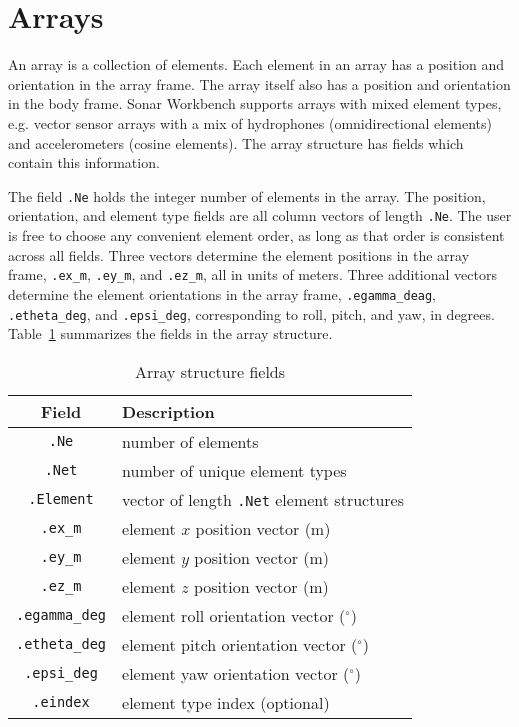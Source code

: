 \section{Arrays}\label{sec:array}

An array is a collection of elements. Each element in an array has a position and orientation in the array frame. The array itself also has a position and orientation in the body frame. Sonar Workbench supports arrays with mixed element types, e.g. vector sensor arrays with a mix of hydrophones (omnidirectional elements) and accelerometers (cosine elements). The array structure has fields which contain this information.

The field \texttt{.Ne} holds the integer number of elements in the array. The position, orientation, and element type fields are all column vectors of length \texttt{.Ne}. The user is free to choose any convenient element order, as long as that order is consistent across all fields. Three vectors determine the element positions in the array frame, \texttt{.ex\_m}, \texttt{.ey\_m}, and \texttt{.ez\_m}, all in units of meters. Three additional vectors determine the element orientations in the array frame, \texttt{.egamma\_deag}, \texttt{.etheta\_deg}, and \texttt{.epsi\_deg}, corresponding to roll, pitch, and yaw, in degrees. Table~\ref{tab:ArrayFields} summarizes the fields in the array structure. 

\begin{table}[!ht]
	\begin{center}
		\caption{Array structure fields}
		\label{tab:ArrayFields}
		\begin{tabular}{c|l} 
			\textbf{Field} & \textbf{Description} \\
			\hline
			\texttt{.Ne} & number of elements \\
			\texttt{.Net} & number of unique element types \\
			\texttt{.Element} & vector of length \texttt{.Net} element structures \\
			\texttt{.ex\_m} & element $x$ position vector (m) \\
			\texttt{.ey\_m} & element $y$ position vector (m) \\
			\texttt{.ez\_m} & element $z$ position vector (m) \\
			\texttt{.egamma\_deg} & element roll orientation vector ($^\circ$) \\
			\texttt{.etheta\_deg} & element pitch orientation vector ($^\circ$) \\
			\texttt{.epsi\_deg} & element yaw orientation vector ($^\circ$) \\
			\texttt{.eindex} & element type index (optional) \\
		\end{tabular}
	\end{center}
\end{table}

